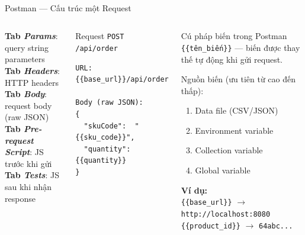 \documentclass[aspectratio=169,10pt]{beamer}
\newcommand{\sref}[1]{\textsuperscript{\scriptsize\cite{#1}}}
\begin{document}
\begin{frame}[fragile]{Postman --- Cấu trúc một Request\sref{postman}}
  \begin{columns}
    \textbf{Tab \textit{Params}}: query string parameters\\
    \textbf{Tab \textit{Headers}}: HTTP headers\\
    \textbf{Tab \textit{Body}}: request body (raw JSON)\\
    \textbf{Tab \textit{Pre-request Script}}: JS trước khi gửi\\
    \textbf{Tab \textit{Tests}}: JS sau khi nhận response\\

    \vspace{0.5em}
    \begin{exampleblock}{Request \texttt{POST /api/order}}
\begin{lstlisting}[style=json,language={}]
URL: {{base_url}}/api/order

Body (raw JSON):
{
  "skuCode":  "{{sku_code}}",
  "quantity": {{quantity}}
}
\end{lstlisting}
    \end{exampleblock}

    \begin{block}{Cú pháp biến trong Postman}
      \texttt{\{\{tên\_biến\}\}} --- biến được thay thế
      tự động khi gửi request.

      \vspace{0.3em}
      Nguồn biến (ưu tiên từ cao đến thấp):
      \begin{enumerate}
        \item Data file (CSV/JSON)
        \item Environment variable
        \item Collection variable
        \item Global variable
      \end{enumerate}

      \vspace{0.3em}
      \textbf{Ví dụ:}\\
      \texttt{\{\{base\_url\}\}} $\to$ \texttt{http://localhost:8080}\\
      \texttt{\{\{product\_id\}\}} $\to$ \texttt{64abc...}
    \end{block}
  \end{columns}
\end{frame}
\end{document}
